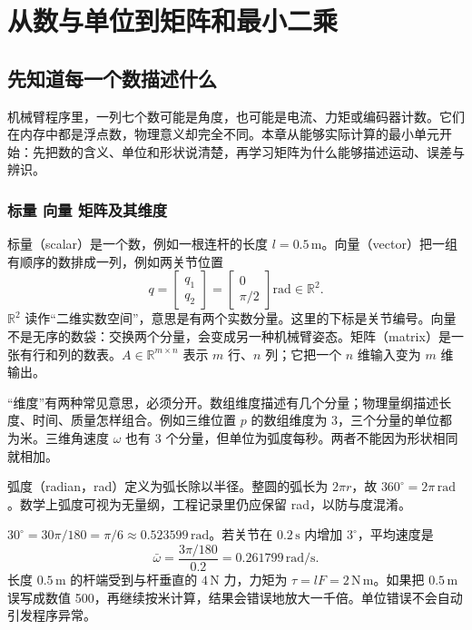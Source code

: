 \chapter{从数与单位到矩阵和最小二乘}\label{ch:math}
\section{先知道每一个数描述什么}
机械臂程序里，一列七个数可能是角度，也可能是电流、力矩或编码器计数。它们在内存中都是浮点数，物理意义却完全不同。本章从能够实际计算的最小单元开始：先把数的含义、单位和形状说清楚，再学习矩阵为什么能够描述运动、误差与辨识。

\subsection{标量 向量 矩阵及其维度}
标量（scalar）是一个数，例如一根连杆的长度 $l=0.5\,\mathrm m$。向量（vector）把一组有顺序的数排成一列，例如两关节位置
\begin{equation}
 q=\begin{bmatrix}q_1\\q_2\end{bmatrix}
 =\begin{bmatrix}0\\\pi/2\end{bmatrix}\mathrm{rad}\in\mathbb R^2.
\end{equation}
$\mathbb R^2$ 读作“二维实数空间”，意思是有两个实数分量。这里的下标是关节编号。向量不是无序的数袋：交换两个分量，会变成另一种机械臂姿态。矩阵（matrix）是一张有行和列的数表。$A\in\mathbb R^{m\times n}$ 表示 $m$ 行、$n$ 列；它把一个 $n$ 维输入变为 $m$ 维输出。

“维度”有两种常见意思，必须分开。数组维度描述有几个分量；物理量纲描述长度、时间、质量怎样组合。例如三维位置 $p$ 的数组维度为 3，三个分量的单位都为米。三维角速度 $\omega$ 也有 3 个分量，但单位为弧度每秒。两者不能因为形状相同就相加。

弧度（radian，rad）定义为弧长除以半径。整圆的弧长为 $2\pi r$，故 $360^\circ=2\pi\,\mathrm{rad}$。数学上弧度可视为无量纲，工程记录里仍应保留 rad，以防与度混淆。
\begin{examplebox}[算例 角度速度和力矩单位]
$30^\circ=30\pi/180=\pi/6\approx0.523599\,\mathrm{rad}$。若关节在 $0.2\,\mathrm s$ 内增加 $3^\circ$，平均速度是
\[
 \bar\omega=\frac{3\pi/180}{0.2}=0.261799\,\mathrm{rad/s}.
\]
长度 $0.5\,\mathrm m$ 的杆端受到与杆垂直的 $4\,\mathrm N$ 力，力矩为 $\tau=lF=2\,\mathrm{N\,m}$。如果把 $0.5\,\mathrm m$ 误写成数值 500，再继续按米计算，结果会错误地放大一千倍。单位错误不会自动引发程序异常。
\end{examplebox}

